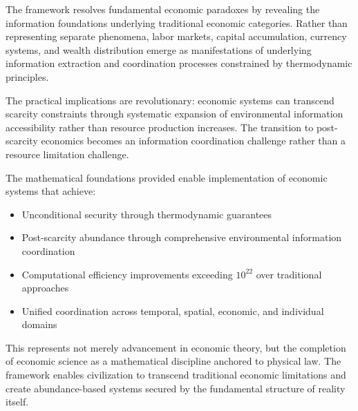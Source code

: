 \documentclass[12pt,a4paper]{article}
\begin{document}
The framework resolves fundamental economic paradoxes by revealing the information foundations underlying traditional economic categories. Rather than representing separate phenomena, labor markets, capital accumulation, currency systems, and wealth distribution emerge as manifestations of underlying information extraction and coordination processes constrained by thermodynamic principles.

The practical implications are revolutionary: economic systems can transcend scarcity constraints through systematic expansion of environmental information accessibility rather than resource production increases. The transition to post-scarcity economics becomes an information coordination challenge rather than a resource limitation challenge.

The mathematical foundations provided enable implementation of economic systems that achieve:
\begin{itemize}
\item Unconditional security through thermodynamic guarantees
\item Post-scarcity abundance through comprehensive environmental information coordination
\item Computational efficiency improvements exceeding $10^{22}$ over traditional approaches
\item Unified coordination across temporal, spatial, economic, and individual domains
\end{itemize}

This represents not merely advancement in economic theory, but the completion of economic science as a mathematical discipline anchored to physical law. The framework enables civilization to transcend traditional economic limitations and create abundance-based systems secured by the fundamental structure of reality itself.
\end{document}
